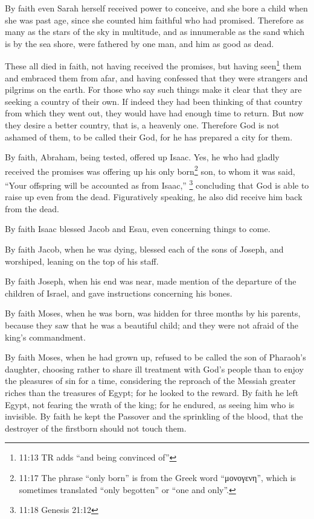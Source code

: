 \myverse{}By faith even Sarah herself received power to conceive, and
she bore a child when she was past age, since she counted him faithful who had promised.
\myverse{}Therefore as many as the stars of the sky in multitude, and as innumerable
as the sand which is by the sea shore, were fathered by one man, and him as good as dead.

\myverse{}These all died in faith, not having received the promises, but
having seen\footnote{11:13 TR adds “and being convinced of”} them and embraced them from afar, and having confessed
that they were strangers and pilgrims on the earth.
\myverse{}For those who say such things make it clear that they are seeking a country
of their own.
\myverse{}If indeed they had been thinking of that country from which they went out,
they would have had enough time to return.
\myverse{}But now they desire a better country, that is, a heavenly one. Therefore
God is not ashamed of them, to be called their God, for he has prepared a city for them.

\myverse{}By faith, Abraham, being tested, offered up Isaac. Yes, he who
had gladly received the promises was offering up his only born\footnote{11:17 The phrase “only born” is from the Greek word “μονογενη”, which is sometimes translated “only
	begotten” or “one and only”.} son,
\myverse{}to whom it was said, “Your offspring will be accounted as from Isaac,”
\footnote{11:18 Genesis 21:12}
\myverse{}concluding that God is able to raise up even from the dead. Figuratively
speaking, he also did receive him back from the dead.

\myverse{}By faith Isaac blessed Jacob and Esau, even concerning things
to come.

\myverse{}By faith Jacob, when he was dying, blessed each of the sons
of Joseph, and worshiped, leaning on the top of his staff.

\myverse{}By faith Joseph, when his end was near, made mention of the
departure of the children of Israel, and gave instructions concerning his bones.

\myverse{}By faith Moses, when he was born, was hidden for three months
by his parents, because they saw that he was a beautiful child; and they were not afraid of the king’s
commandment.

\myverse{}By faith Moses, when he had grown up, refused to be called the
son of Pharaoh’s daughter,
\myverse{}choosing rather to share ill treatment with God’s people than to enjoy the
pleasures of sin for a time,
\myverse{}considering the reproach of the Messiah greater riches than the treasures
of Egypt; for he looked to the reward.
\myverse{}By faith he left Egypt, not fearing the wrath of the king; for he endured,
as seeing him who is invisible.
\myverse{}By faith he kept the Passover and the sprinkling of the blood, that the destroyer
of the firstborn should not touch them.

